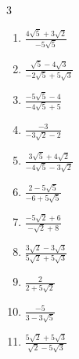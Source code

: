 \begin{multicols}{3}
\begin{enumerate}
  \item $\displaystyle \frac{4\sqrt{5}+3\sqrt{2}}{-5\sqrt{5}}$


  \item $\displaystyle \frac{\sqrt{5}-4\sqrt{3}}{-2\sqrt{5}+5\sqrt{3}}$


  \item $\displaystyle \frac{-5\sqrt{5}-4}{-4\sqrt{5}+5}$


\columnbreak %

  \item $\displaystyle \frac{-3}{-3\sqrt{2}-2}$


  \item $\displaystyle \frac{3\sqrt{5}+4\sqrt{2}}{-4\sqrt{5}-3\sqrt{2}}$


  \item $\displaystyle \frac{2-5\sqrt{5}}{-6+5\sqrt{5}}$


  \item $\displaystyle \frac{-5\sqrt{2}+6}{-\sqrt{2}+8}$


  \item $\displaystyle \frac{3\sqrt{2}-3\sqrt{3}}{5\sqrt{2}+5\sqrt{3}}$


\columnbreak %

\resetques

  \item $\displaystyle \frac{2}{2+5\sqrt{2}}$


  \item $\displaystyle \frac{-5}{3-3\sqrt{5}}$


  \item $\displaystyle \frac{5\sqrt{2}+5\sqrt{3}}{\sqrt{2}-5\sqrt{3}}$


\end{enumerate}
\end{multicols}
